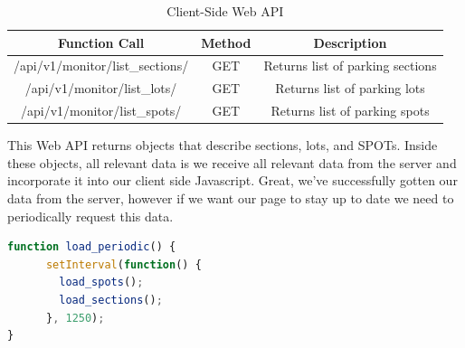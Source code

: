 \newpage
\begin{table}[!htb]
\renewcommand{\arraystretch}{1}
\centering
\caption{Client-Side Web API}
\begin{tabular}{|c||c|c|}
\hline
\textbf{Function Call} & \textbf{Method} & \textbf{Description} \\
\hline
/api/v1/monitor/list\_sections/ & GET & Returns list of parking sections \\
\hline
/api/v1/monitor/list\_lots/ & GET & Returns list of parking lots \\
\hline
/api/v1/monitor/list\_spots/ & GET & Returns list of parking spots \\
\hline

\end{tabular}
\end{table}

This Web API returns objects that describe sections, lots, and SPOTs.
Inside these objects, all relevant data is we receive all relevant data from the server and incorporate it into our client side Javascript.
Great, we've successfully gotten our data from the server, however if we want our page to stay up to date we need to periodically request this data.

\vspace{0.5cm}
\begin{lstlisting}[language=JavaScript]
function load_periodic() {
      setInterval(function() {
        load_spots();
        load_sections();
      }, 1250);
}
\end{lstlisting}




\newpage

